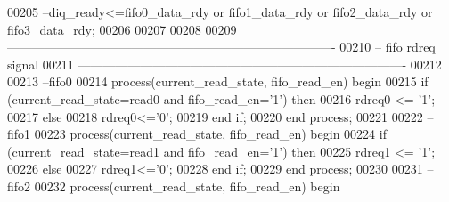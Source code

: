 \begin{DoxyCode}
00205 \textcolor{keyword}{--diq\_ready<=fifo0\_data\_rdy or fifo1\_data\_rdy or fifo2\_data\_rdy or fifo3\_data\_rdy;}
00206 
00207 
00208 
00209 \textcolor{keyword}{-------------------------------------------------------------------------------         }
00210 \textcolor{keyword}{-- fifo rdreq signal}
00211 \textcolor{keyword}{-------------------------------------------------------------------------------}
00212 
00213 \textcolor{keyword}{--fifo0}
00214 \textcolor{keywordflow}{process}(current_read_state, fifo_read_en) \textcolor{keywordflow}{begin}
00215     \textcolor{keywordflow}{if} \textcolor{vhdlchar}{(}\textcolor{vhdlchar}{current_read_state}\textcolor{vhdlchar}{=}\textcolor{vhdlchar}{read0} \textcolor{keywordflow}{and} \textcolor{vhdlchar}{fifo_read_en}\textcolor{vhdlchar}{=}\textcolor{vhdlchar}{'}\textcolor{vhdllogic}{}\textcolor{vhdllogic}{1}\textcolor{vhdlchar}{'}\textcolor{vhdlchar}{)} \textcolor{keywordflow}{then}
00216             \textcolor{vhdlchar}{rdreq0} \textcolor{vhdlchar}{<=} \textcolor{vhdlchar}{'}\textcolor{vhdllogic}{}\textcolor{vhdllogic}{1}\textcolor{vhdlchar}{'}; 
00217     \textcolor{keywordflow}{else}
00218           \textcolor{vhdlchar}{rdreq0}\textcolor{vhdlchar}{<=}\textcolor{vhdlchar}{'}\textcolor{vhdllogic}{}\textcolor{vhdllogic}{0}\textcolor{vhdlchar}{'};
00219     \textcolor{keywordflow}{end} \textcolor{keywordflow}{if}; 
00220 \textcolor{keywordflow}{end} \textcolor{keywordflow}{process}; 
00221 
00222 \textcolor{keyword}{--fifo1}
00223 \textcolor{keywordflow}{process}(current_read_state, fifo_read_en) \textcolor{keywordflow}{begin}
00224     \textcolor{keywordflow}{if} \textcolor{vhdlchar}{(}\textcolor{vhdlchar}{current_read_state}\textcolor{vhdlchar}{=}\textcolor{vhdlchar}{read1} \textcolor{keywordflow}{and} \textcolor{vhdlchar}{fifo_read_en}\textcolor{vhdlchar}{=}\textcolor{vhdlchar}{'}\textcolor{vhdllogic}{}\textcolor{vhdllogic}{1}\textcolor{vhdlchar}{'}\textcolor{vhdlchar}{)} \textcolor{keywordflow}{then}
00225             \textcolor{vhdlchar}{rdreq1} \textcolor{vhdlchar}{<=} \textcolor{vhdlchar}{'}\textcolor{vhdllogic}{}\textcolor{vhdllogic}{1}\textcolor{vhdlchar}{'}; 
00226     \textcolor{keywordflow}{else}
00227           \textcolor{vhdlchar}{rdreq1}\textcolor{vhdlchar}{<=}\textcolor{vhdlchar}{'}\textcolor{vhdllogic}{}\textcolor{vhdllogic}{0}\textcolor{vhdlchar}{'};
00228     \textcolor{keywordflow}{end} \textcolor{keywordflow}{if}; 
00229 \textcolor{keywordflow}{end} \textcolor{keywordflow}{process};
00230  
00231 \textcolor{keyword}{--fifo2}
00232 \textcolor{keywordflow}{process}(current_read_state, fifo_read_en) \textcolor{keywordflow}{begin}

\end{DoxyCode}

